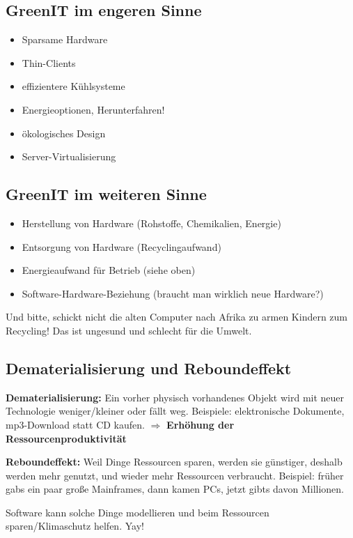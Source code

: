 \begin{multicols}{2}
\subsection{GreenIT im engeren Sinne}

\begin{itemize}
\item Sparsame Hardware
\item Thin-Clients
\item effizientere Kühlsysteme
\item Energieoptionen, Herunterfahren!
\item ökologisches Design
\item Server-Virtualisierung
\end{itemize}

\subsection{GreenIT im weiteren Sinne}

\begin{itemize}
\item Herstellung von Hardware (Rohstoffe, Chemikalien, Energie)
\item Entsorgung von Hardware (Recyclingaufwand)
\item Energieaufwand für Betrieb (siehe oben)
\item Software-Hardware-Beziehung (braucht man wirklich neue Hardware?)
\end{itemize}
\end{multicols}

Und bitte, schickt nicht die alten Computer nach Afrika zu armen Kindern zum Recycling!
Das ist ungesund und schlecht für die Umwelt.

\subsection{Dematerialisierung und Reboundeffekt}

\textbf{Dematerialisierung:} Ein vorher physisch vorhandenes Objekt wird mit neuer Technologie weniger/kleiner oder
fällt weg. Beispiele: elektronische Dokumente, mp3-Download statt CD kaufen.
$\Rightarrow$ \textbf{Erhöhung der Ressourcenproduktivität}

\textbf{Reboundeffekt:} Weil Dinge Ressourcen sparen, werden sie günstiger, deshalb werden mehr genutzt, und
wieder mehr Ressourcen verbraucht. Beispiel: früher gabs ein paar große Mainframes, dann kamen
PCs, jetzt gibts davon Millionen.

Software kann solche Dinge modellieren und beim Ressourcen sparen/Klimaschutz helfen. Yay!

